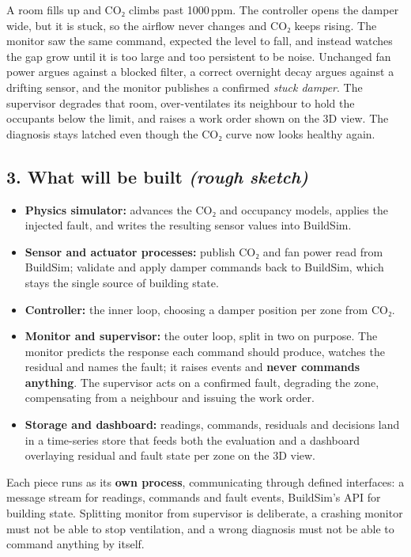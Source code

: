 \documentclass[
  11pt,
]{article}
\providecommand{\tightlist}{%
  \setlength{\itemsep}{0pt}\setlength{\parskip}{0pt}}
\begin{document}
A room fills up and CO₂ climbs past 1000\,ppm. The controller opens the
damper wide, but it is stuck, so the airflow never changes and CO₂ keeps
rising. The monitor saw the same command, expected the level to fall,
and instead watches the gap grow until it is too large and too
persistent to be noise. Unchanged fan power argues against a blocked
filter, a correct overnight decay argues against a drifting sensor, and
the monitor publishes a confirmed \emph{stuck damper}. The supervisor
degrades that room, over-ventilates its neighbour to hold the occupants
below the limit, and raises a work order shown on the 3D view. The
diagnosis stays latched even though the CO₂ curve now looks healthy
again.

\hypertarget{what-will-be-built}{%
\subsection{\texorpdfstring{3. What will be built \emph{(rough
sketch)}}{3. What will be built (rough sketch)}}\label{what-will-be-built}}

\begin{itemize}
\tightlist
\item
  \textbf{Physics simulator:} advances the CO₂ and occupancy models,
  applies the injected fault, and writes the resulting sensor values
  into BuildSim.
\item
  \textbf{Sensor and actuator processes:} publish CO₂ and fan power read
  from BuildSim; validate and apply damper commands back to BuildSim,
  which stays the single source of building state.
\item
  \textbf{Controller:} the inner loop, choosing a damper position per
  zone from CO₂.
\item
  \textbf{Monitor and supervisor:} the outer loop, split in two on
  purpose. The monitor predicts the response each command should
  produce, watches the residual and names the fault; it raises events
  and \textbf{never commands anything}. The supervisor acts on a
  confirmed fault, degrading the zone, compensating from a neighbour and
  issuing the work order.
\item
  \textbf{Storage and dashboard:} readings, commands, residuals and
  decisions land in a time-series store that feeds both the evaluation
  and a dashboard overlaying residual and fault state per zone on the 3D
  view.
\end{itemize}

Each piece runs as its \textbf{own process}, communicating through
defined interfaces: a message stream for readings, commands and fault
events, BuildSim's API for building state. Splitting monitor from
supervisor is deliberate, a crashing monitor must not be able to stop
ventilation, and a wrong diagnosis must not be able to command anything
by itself.
\end{document}
